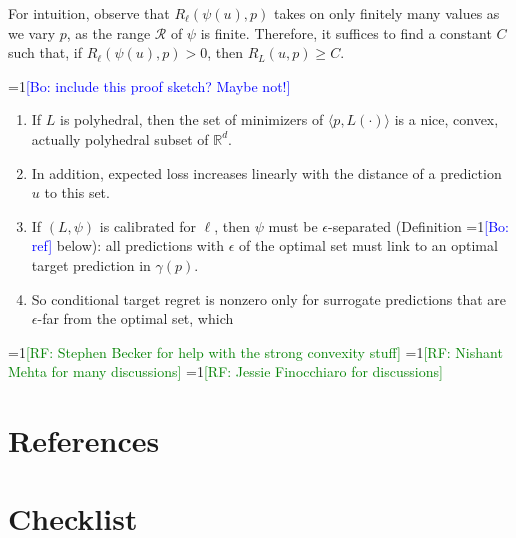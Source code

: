 \documentclass{article}
\newcommand{\Comments}{1}
\newcommand{\mynote}[2]{\ifnum\Comments=1\textcolor{#1}{#2}\fi}
\newcommand{\raf}[1]{\mynote{green}{[RF: #1]}}
\newcommand{\bo}[1]{\mynote{blue}{[Bo: #1]}}
\newcommand{\reals}{\mathbb{R}}
\newcommand{\R}{\mathcal{R}}
\newcommand{\inprod}[2]{\langle #1, #2 \rangle}%
\begin{document}
For intuition, observe that $R_{\ell}(\psi(u),p)$ takes on only finitely many values as we vary $p$, as the range $\R$ of $\psi$ is finite.
Therefore, it suffices to find a constant $C$ such that, if $R_{\ell}(\psi(u),p) > 0$, then $R_L(u,p) \geq C$.

\bo{include this proof sketch? Maybe not!}
\begin{enumerate}
  \item If $L$ is polyhedral, then the set of minimizers of $\inprod{p}{L(\cdot)}$ is a nice, convex, actually polyhedral subset of $\reals^d$.
  \item In addition, expected loss increases linearly with the distance of a prediction $u$ to this set.
  \item If $(L,\psi)$ is calibrated for $\ell$, then $\psi$ must be $\epsilon$-separated (Definition \bo{ref} below): all predictions with $\epsilon$ of the optimal set must link to an optimal target prediction in $\gamma(p)$.
  \item So conditional target regret is nonzero only for surrogate predictions that are $\epsilon$-far from the optimal set, which 
\end{enumerate}






\begin{ack}
  \raf{Stephen Becker for help with the strong convexity stuff}
  \raf{Nishant Mehta for many discussions}
  \raf{Jessie Finocchiaro for discussions}
\end{ack}

\section*{References}




\section*{Checklist}
\end{document}
